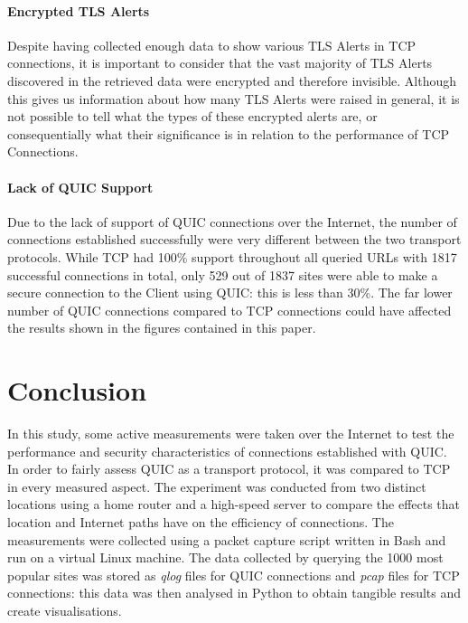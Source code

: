 \documentclass{l4proj}
\begin{document}
\subsubsection{Encrypted TLS Alerts} Despite having collected enough data to show various TLS Alerts in TCP connections, it is important to consider that the vast majority of TLS Alerts discovered in the retrieved data were encrypted and therefore invisible. Although this gives us information about how many TLS Alerts were raised in general, it is not possible to tell what the types of these encrypted alerts are, or consequentially what their significance is in relation to the performance of TCP Connections.

\subsubsection{Lack of QUIC Support} Due to the lack of support of QUIC connections over the Internet, the number of connections established successfully were very different between the two transport protocols. While TCP had 100\% support throughout all queried URLs with 1817 successful connections in total, only 529 out of 1837 sites were able to make a secure connection to the Client using QUIC: this is less than 30\%. The far lower number of QUIC connections compared to TCP connections could have affected the results shown in the figures contained in this paper.



\chapter{Conclusion}    

In this study, some active measurements were taken over the Internet to test the performance and security characteristics of connections established with QUIC. In order to fairly assess QUIC as a transport protocol, it was compared to TCP in every measured aspect. The experiment was conducted from two distinct locations using a home router and a high-speed server to compare the effects that location and Internet paths have on the efficiency of connections. The measurements were collected using a packet capture script written in Bash and run on a virtual Linux machine. The data collected by querying the 1000 most popular sites was stored as \emph{qlog} files for QUIC connections and \emph{pcap} files for TCP connections: this data was then analysed in Python to obtain tangible results and create visualisations.
\end{document}
